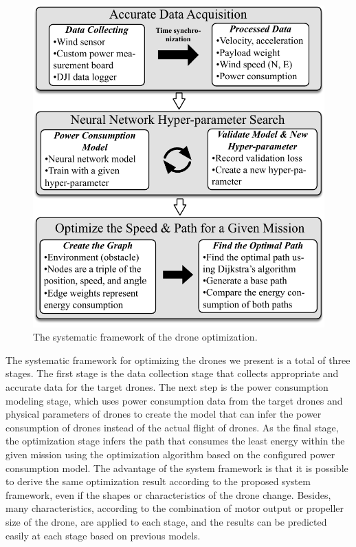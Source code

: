\documentclass[journal]{./template/IEEEtran}
\begin{document}
\begin{figure}[ht]
\centering\includegraphics[scale=0.65]{fig16/system-framework.pdf}
\caption{The systematic framework of the drone optimization.}
\label{fig:freamwork}
\end{figure}

The systematic framework for optimizing the drones we present is a total of three stages. 
The first stage is the data collection stage that collects appropriate and accurate data for the target drones. The next step is the power consumption modeling stage, which uses power consumption data from the target drones and physical parameters of drones to create the model that can infer the power consumption of drones instead of the actual flight of drones. As the final stage, the optimization stage infers the path that consumes the least energy within the given mission using the optimization algorithm based on the configured power consumption model.
The advantage of the system framework is that it is possible to derive the same optimization result according to the proposed system framework, even if the shapes or characteristics of the drone change.
Besides, many characteristics, according to the combination of motor output or propeller size of the drone, are applied to each stage, and the results can be predicted easily at each stage based on previous models.
\end{document}
